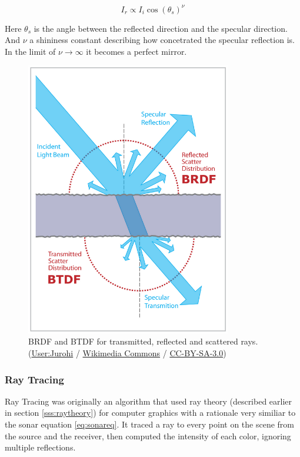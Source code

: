 \begin{equation}
\label{eq:phong}
I_r \propto	 I_i \cos(\theta_s)^\nu
\end{equation} 

Here $\theta_s$ is the angle between the reflected direction and the specular
direction. And $\nu$ a shininess constant describing how concetrated the
specular reflection is. In the limit of $\nu \to \infty$ it becomes a perfect mirror.


\begin{figure}
	\centering
	\includegraphics[width=0.8\textwidth]{Chap2/fig/BRDF_BTDF}
	\caption{BRDF and BTDF for transmitted, reflected and scattered rays.
	(\textcopyright  \href{http://commons.wikimedia.org/wiki/User:Jurohi}{User:Jurohi} /
	\href{http://commons.wikimedia.org/}{Wikimedia Commons} /
	\href{http://creativecommons.org/licenses/by-sa/3.0/}{CC-BY-SA-3.0})}
	\label{fig:brdfbtdf}
\end{figure}




\subsubsection{Ray Tracing}

Ray Tracing was originally an algorithm that used ray theory
(described earlier in section \ref{sss:raytheory}) for computer graphics with a
rationale very similiar to the sonar equation \ref{eq:sonareq}. It traced a ray to every point on the scene
from the source and the receiver, then computed the intensity of each color,
ignoring multiple reflections. 

